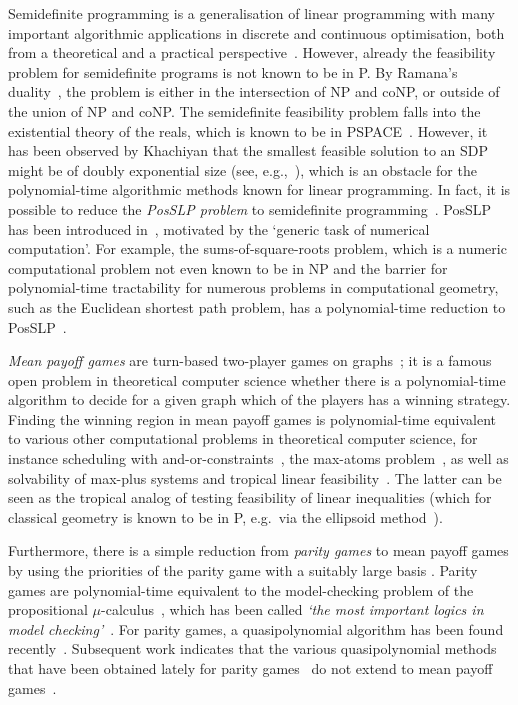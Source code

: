 \documentclass[11pt]{article}
\theoremstyle{definition}
\theoremstyle{remark}
\begin{document}
Semidefinite programming is a generalisation of linear programming with many important algorithmic applications in discrete and continuous optimisation, both from a theoretical and a practical perspective~\cite{GroetschelLovaszSchrijver,ben-tal_nemirovski,lasserre_book2009}.
However, already the feasibility problem for semidefinite programs is not known to be in P. 
By Ramana's duality~\cite{Ramana}, the problem is either in the intersection of NP and coNP, or outside of the union of NP and coNP. 
The semidefinite feasibility problem falls into the existential theory of the reals, which is known to be in PSPACE~\cite{Canny:1988:AGC:62212.62257}. 
However, it has been observed by Khachiyan that the smallest feasible solution to an SDP might be of doubly exponential size (see, e.g.,~\cite{KhachiyanPorkolab}), which is an obstacle for the polynomial-time algorithmic methods known for linear programming. In fact, it is possible to reduce the \emph{PosSLP problem} to semidefinite programming~\cite{Tarasov20082070}. 
PosSLP has been introduced in~\cite{ABKM08}, motivated by the `generic task of numerical computation'. For example, the sums-of-square-roots problem, which is a numeric computational problem not even known to be in NP and the barrier for polynomial-time tractability for numerous problems in computational geometry, such as the Euclidean shortest path problem, has a polynomial-time reduction to PosSLP~\cite{ABKM08}. 

\emph{Mean payoff games} are turn-based two-player games on graphs~\cite{EhrenfeuchtMycielski,ZwickPaterson}; it is a famous open problem in theoretical computer science whether there is a polynomial-time algorithm to decide for a given graph which of the players has a winning strategy. Finding the winning region in mean payoff games is polynomial-time equivalent to various other computational problems in theoretical computer science, for instance 
scheduling with and-or-constraints~\cite{and-or-scheduling}, the max-atoms problem~\cite{Max-atoms}, as well as solvability of max-plus systems and tropical linear feasibility~\cite{MaxPlus,polyhedra_equiv_mean_payoff}. 
The latter can be seen as the tropical analog of testing feasibility of linear inequalities (which for classical geometry is known to be in P, e.g.\ via the ellipsoid method~\cite{Khachiyan,GroetschelLovaszSchrijver}). 

Furthermore, there is a simple reduction from \emph{parity games} to mean payoff games by using the priorities of the parity game with a suitably large basis \cite{puri1995theory}. 
Parity games are polynomial-time equivalent to the model-checking problem of the propositional $\mu$-calculus~\cite{emerson_jutla_sistla}, which has been called \emph{`the most important logics in model checking'}~\cite{BradfieldIgor}. 
For parity games, a quasipolynomial algorithm has been found recently~\cite{CaludeJKLS22}. 
Subsequent work indicates that the various quasipolynomial methods that have been obtained lately for parity games~\cite{LehtinenPSW22,JurdzinskiMT22,LehtinenB20} 
do not extend to mean payoff games~\cite{ColcombetFGO22}. 
\end{document}
